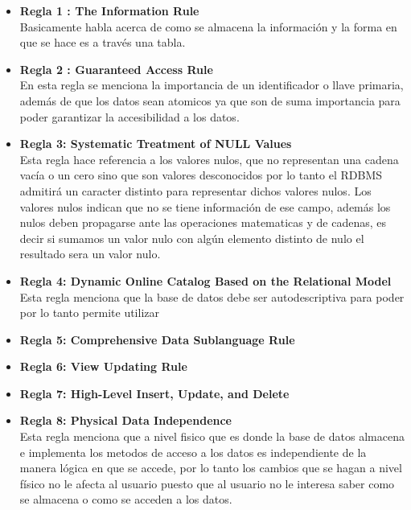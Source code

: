 \documentclass{article}
\begin{document}
    \begin{itemize}
    	\item\textbf{Regla 1 : The Information Rule}\\
    	 Basicamente habla acerca de como se almacena la información y la forma en que se hace es a través una tabla.
    	\item\textbf{Regla 2 : Guaranteed Access Rule}\\
    	
    	En esta regla se menciona la importancia de un identificador o llave primaria, además de  que los datos sean atomicos ya que son de suma importancia para poder garantizar la accesibilidad a los datos.
    	
    	\item\textbf{Regla 3: Systematic Treatment of NULL Values}\\
    	
    	Esta regla hace referencia a los valores nulos, que no representan una cadena vacía o un cero sino que son valores desconocidos por lo tanto el RDBMS admitirá un caracter distinto para representar dichos valores nulos. Los valores nulos indican que no se tiene información de ese campo, además los nulos deben propagarse ante las operaciones matematicas y de cadenas, es decir si sumamos un valor nulo con algún elemento distinto de nulo el resultado sera un valor nulo.
    	
    	\item\textbf{Regla 4: Dynamic Online Catalog Based on the Relational Model}\\
    	Esta regla menciona que la base de datos debe ser autodescriptiva para poder por lo tanto permite utilizar 
    	
    	\item\textbf{Regla 5: Comprehensive Data Sublanguage Rule}\\
    	
    	\item\textbf{Regla 6: View Updating Rule}\\
    	
    	\item\textbf{Regla 7: High-Level Insert, Update, and Delete}\\
    	
    	\item\textbf{Regla 8: Physical Data Independence}\\
    	Esta regla menciona que a nivel fisico que es donde la base de datos almacena e implementa los metodos de acceso a los datos es independiente de la manera lógica en que se accede, por lo tanto los cambios que se hagan a nivel físico no le afecta al usuario puesto que al usuario no le interesa saber como se almacena o como se acceden a los datos. 
    	

\end{itemize}
\end{document}

